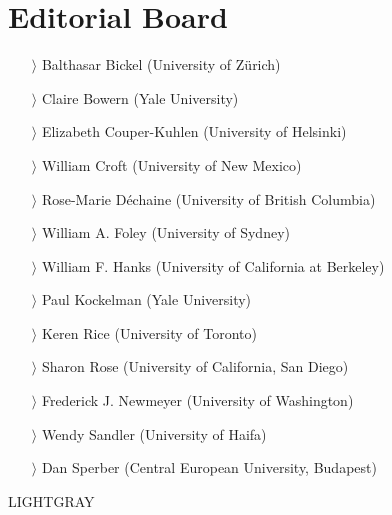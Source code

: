 \documentclass[
notumble,
nofoldmark,
]{leaflet}
\begin{document}
{    \section{Editorial Board}    
    \begin{itemize}
    \item[$\rangle$] Balthasar Bickel (University of Z\"urich)
    \item[$\rangle$] Claire Bowern (Yale University)
    \item[$\rangle$] Elizabeth Couper-Kuhlen (University of Helsinki)
    \item[$\rangle$] William Croft (University of New Mexico)
    \item[$\rangle$] Rose-Marie D\'echaine (University of British Columbia)
    \item[$\rangle$] William A. Foley (University of Sydney)
    \item[$\rangle$] William F. Hanks (University of California at Berkeley)
    \item[$\rangle$] Paul Kockelman (Yale University)
    \item[$\rangle$] Keren Rice (University of Toronto)
    \item[$\rangle$] Sharon Rose (University of California, San Diego)
    \item[$\rangle$] Frederick J. Newmeyer (University of Washington)
    \item[$\rangle$] Wendy Sandler (University of Haifa)
    \item[$\rangle$] Dan Sperber (Central European University, Budapest)
    \end{itemize}
    }{LIGHTGRAY}
\end{document}
